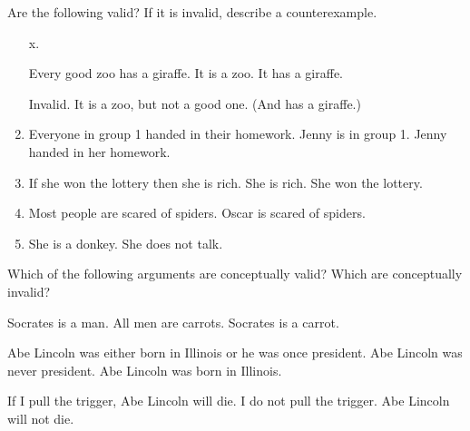 \problempart
Are the following valid? If it is invalid, describe a counterexample. 
\begin{enumerate}
\item[x.]
\begin{earg}
\prem Every good zoo has a giraffe.
\prem It is a zoo.
\conc It has a giraffe.
\end{earg}
\prem Invalid. It is a zoo, but not a good one. (And has a giraffe.)
\item 
\begin{earg}
\prem Everyone in group 1 handed in their homework.
\prem Jenny is in group 1.
\conc Jenny handed in her homework.
\end{earg}
\item 
\begin{earg}
\prem If she won the lottery then she is rich.
\prem She is rich.
\conc She won the lottery.
\end{earg}
\item 
\begin{earg}
\prem Most people are scared of spiders. 
\conc Oscar is scared of spiders. 
\end{earg}
\item
\begin{earg}
\prem She is a donkey.
\conc She does not talk.
\end{earg}
\end{enumerate}


\problempart
Which of the following arguments are conceptually valid? Which are conceptually invalid?

\begin{earg}
\prem Socrates is a man.
\prem All men are carrots.
\conc Socrates is a carrot.
\end{earg}

\begin{earg}
\prem Abe Lincoln was either born in Illinois or he was once president.
\prem Abe Lincoln was never president.
\conc Abe Lincoln was born in Illinois.
\end{earg}

\begin{earg}
\prem If I pull the trigger, Abe Lincoln will die.
\prem I do not pull the trigger.
\conc Abe Lincoln will not die.
\end{earg}

